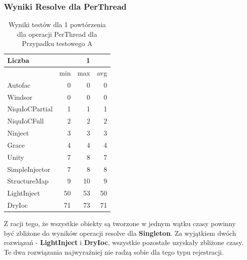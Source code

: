 \documentclass[12pt]{article}
\begin{document}
\subsubsection{Wyniki Resolve dla PerThread}
\begin{table}[H]
\captionsetup{belowskip=0pt,aboveskip=0pt}
\begin{center}
\begin{small}
	\begin{tabular}{ | l | r r r | }
    		\hline
Liczba & & 1 & \\ \hline
 & min & max & avg \\ \hline
Autofac & 0 & 0 & 0 \\ \hline
Windsor & 0 & 0 & 0 \\ \hline
NiquIoCPartial & 1 & 1 & 1 \\ \hline
NiquIoCFull & 2 & 2 & 2 \\ \hline
Ninject & 3 & 3 & 3 \\ \hline
Grace & 4 & 4 & 4 \\ \hline
Unity & 7 & 8 & 7 \\ \hline
SimpleInjector & 7 & 8 & 8 \\ \hline
StructureMap & 9 & 10 & 9 \\ \hline
LightInject & 50 & 53 & 50 \\ \hline
DryIoc & 71 & 73 & 71 \\ \hline
  	\end{tabular}
\end{small}
\end{center}
\caption{Wyniki testów dla 1 powtórzenia dla operacji PerThread dla Przypadku testowego A}
\label{TestCaseA_PerThread1}
\end{table}
Z racji tego, że wszystkie obiekty są tworzone w jednym wątku czasy powinny być zbliżone do wyników operacji resolve dla \textbf{Singleton}. Za wyjątkiem dwóch rozwiązań - \textbf{LightInject} i \textbf{DryIoc}, wszystkie pozostałe uzyskały zbliżone czasy. Te dwa rozwiązania najwyraźniej nie radzą sobie dla tego typu rejestracji.
\\ \\
\end{document}
